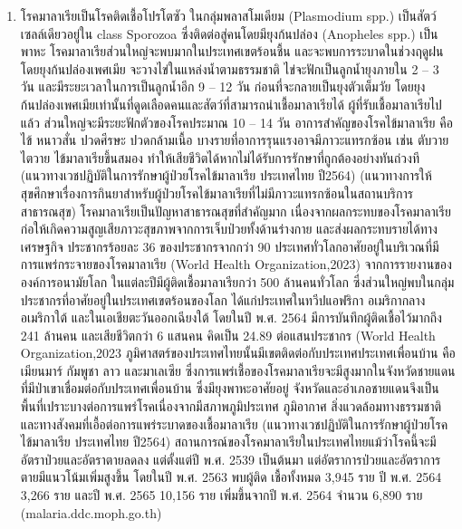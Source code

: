 \begin{titlepage}
\begin{flushleft}
  \begin{enumerate}
    \item{โรคมาลาเรียเป็นโรคติดเชื้อโปรโตซัว ในกลุ่มพลาสโมเดียม (Plasmodium spp.) เป็นสัตว์เซลล์เดียวอยู่ใน class Sporozoa  ซึ่งติดต่อสู่คนโดยมียุงก้นปล่อง (Anopheles spp.) เป็นพาหะ โรคมาลาเรียส่วนใหญ่จะพบมากในประเทศเขตร้อนชื้น และจะพบการระบาดในช่วงฤดูฝน โดยยุงก้นปล่องเพศเมีย จะวางไข่ในแหล่งน้ำตามธรรมชาติ ไข่จะฟักเป็นลูกน้ำยุงภายใน 2 – 3 วัน และมีระยะเวลาในการเป็นลูกน้ำอีก 9 – 12 วัน ก่อนที่จะกลายเป็นยุงตัวเต็มวัย โดยยุงก้นปล่องเพศเมียเท่านั้นที่ดูดเลือดคนและสัตว์ที่สามารถนำเชื้อมาลาเรียได้ ผู้ที่รับเชื้อมาลาเรียไปแล้ว ส่วนใหญ่จะมีระยะฟักตัวของโรคประมาณ 10 – 14 วัน อาการสำคัญของโรคไข้มาลาเรีย คือ ไข้ หนาวสั่น ปวดศีรษะ ปวดกล้ามเนื้อ บางรายที่อาการรุนแรงอาจมีภาวะแทรกซ้อน เช่น ตับวาย ไตวาย ไข้มาลาเรียขึ้นสมอง ทำให้เสียชีวิตได้หากไม่ได้รับการรักษาที่ถูกต้องอย่างทันถ่วงที (แนวทางเวชปฏิบัติในการรักษาผู้ป่วยโรคไข้มาลาเรีย ประเทศไทย ปี2564) (แนวทางการให้สุขศึกษาเรื่องการกินยาสำหรับผู้ป่วยโรคไข้มาลาเรียที่ไม่มีภาวะแทรกซ้อนในสถานบริการสาธารณสุข) โรคมาลาเรียเป็นปัญหาสาธารณสุขที่สำคัญมาก เนื่องจากผลกระทบของโรคมาลาเรียก่อให้เกิดความสูญเสียภาวะสุขภาพจากการเจ็บป่วยทั้งด้านร่างกาย  และส่งผลกระทบรายได้ทางเศรษฐกิจ ประชากรร้อยละ 36 ของประชากรจากกว่า 90 ประเทศทั่วโลกอาศัยอยู่ในบริเวณที่มีการแพร่กระจายของโรคมาลาเรีย (World Health Organization,2023)
    จากการรายงานขององค์การอนามัยโลก ในแต่ละปีมีผู้ติดเชื้อมาลาเรียกว่า 500 ล้านคนทั่วโลก ซึ่งส่วนใหญ่พบในกลุ่มประชากรที่อาศัยอยู่ในประเทศเขตร้อนของโลก ได้แก่ประเทศในทวีปแอฟริกา อเมริกากลาง อเมริกาใต้ และในเอเชียตะวันออกเฉียงใต้ โดยในปี พ.ศ. 2564  มีการบันทึกผู้ติดเชื้อไว้มากถึง 241 ล้านคน และเสียชีวิตกว่า 6 แสนคน คิดเป็น 24.89 ต่อแสนประชากร (World Health Organization,2023
    ภูมิศาสตร์ของประเทศไทยนั้นมีเขตติดต่อกับประเทศประเทศเพื่อนบ้าน คือ เมียนมาร์ กัมพูชา ลาว และมาเลเซีย ซึ่งการแพร่เชื้อของโรคมาลาเรียจะมีสูงมากในจังหวัดชายแดนที่มีป่าเขาเชื่อมต่อกับประเทศเพื่อนบ้าน ซึ่งมียุงพาหะอาศัยอยู่ จังหวัดและอำเภอชายแดนจึงเป็นพื้นที่เปราะบางต่อการแพร่โรคเนื่องจากมีสภาพภูมิประเทศ ภูมิอากาศ สิ่งแวดล้อมทางธรรมชาติและทางสังคมที่เอื้อต่อการแพร่ระบาดของเชื้อมาลาเรีย  (แนวทางเวชปฏิบัติในการรักษาผู้ป่วยโรคไข้มาลาเรีย ประเทศไทย ปี2564) 
    สถานการณ์ของโรคมาลาเรียในประเทศไทยแม้ว่าโรคนี้จะมีอัตราป่วยและอัตราตายลดลง แต่ตั้งแต่ปี  พ.ศ. 2539 เป็นต้นมา แต่อัตราการป่วยและอัตราการตายมีแนวโน้มเพิ่มสูงขึ้น โดยในปี พ.ศ. 2563 พบผู้ติด เชื้อทั้งหมด 3,945 ราย ปี พ.ศ. 2564 3,266 ราย และปี พ.ศ. 2565 10,156 ราย  เพิ่มขึ้นจากปี พ.ศ. 2564 จำนวน 6,890 ราย (malaria.ddc.moph.go.th)
}
\end{enumerate}
\end{flushleft}
\end{titlepage}
